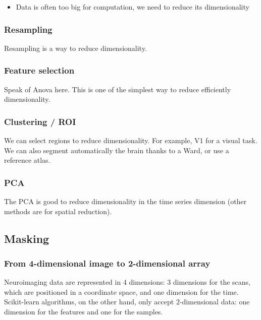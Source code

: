 \documentclass{frontiersSCNS} %
\begin{document}
\begin{itemize}
    \item Data is often too big for computation, we need to reduce its
        dimensionality
\end{itemize}

\subsubsection{Resampling}

Resampling is a way to reduce dimensionality.

\subsubsection{Feature selection}

Speak of Anova here. This is one of the simplest way to reduce efficiently
dimensionality.

\subsubsection{Clustering / ROI}

We can select regions to reduce dimensionality. For example, V1 for a visual
task. We can also segment automatically the brain thanks to a Ward, or use a
reference atlas.

\subsubsection{PCA}

The PCA is good to reduce dimensionality in the time series dimension (other
methods are for spatial reduction).


\subsection{Masking}


\subsubsection{From 4-dimensional image to 2-dimensional array}

Neuroimaging data are represented in 4 dimensions: 3 dimensions for the scans,
which are positioned in a coordinate space, and one dimension for the time.
Scikit-learn algorithms, on the other hand, only accept 2-dimensional data: one
dimension for the features and one for the samples.\\
\end{document}
